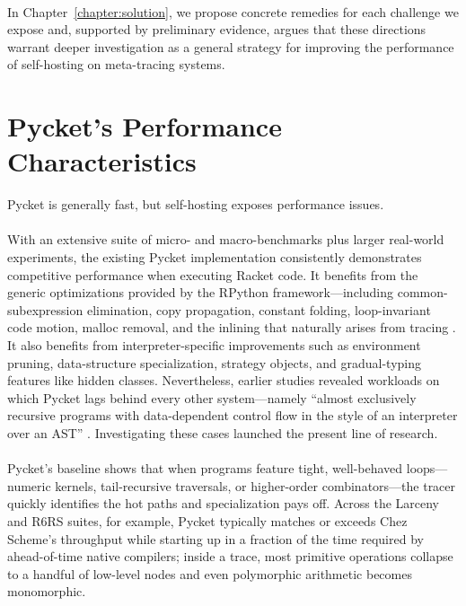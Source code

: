 	\paragraph{}%
		In Chapter~\ref{chapter:solution}, we propose concrete remedies for each challenge we expose and, supported by preliminary evidence, argues that these directions warrant deeper investigation as a general strategy for improving the performance of self-hosting on meta-tracing systems.

	\section{Pycket's Performance Characteristics}
	\label{section:pycket-performance-characteristics}

	\begin{sectionpoint}
		Pycket is generally fast, but self-hosting exposes performance issues.
	\end{sectionpoint}

	\paragraph{}%
		With an extensive suite of micro- and macro-benchmarks plus larger real-world experiments, the existing Pycket implementation consistently demonstrates competitive performance when executing Racket code. It benefits from the generic optimizations provided by the RPython framework—including common-subexpression elimination, copy propagation, constant folding, loop-invariant code motion, malloc removal, and the inlining that naturally arises from tracing \cite{loop-aware:12,hotpath:06,malloc-removal:11}. It also benefits from interpreter-specific improvements such as environment pruning, data-structure specialization, strategy objects, and gradual-typing features like hidden classes. Nevertheless, earlier studies revealed workloads on which Pycket lags behind every other system—namely “almost exclusively recursive programs with data-dependent control flow in the style of an interpreter over an AST” \cite{pycketmain,pycketmain2}. Investigating these cases launched the present line of research.

	\paragraph{}%
		Pycket's baseline shows that when programs feature tight, well-behaved loops—numeric kernels, tail-recursive traversals, or higher-order combinators—the tracer quickly identifies the hot paths and specialization pays off. Across the Larceny and R6RS suites, for example, Pycket typically matches or exceeds Chez Scheme's throughput while starting up in a fraction of the time required by ahead-of-time native compilers; inside a trace, most primitive operations collapse to a handful of low-level nodes and even polymorphic arithmetic becomes monomorphic.

